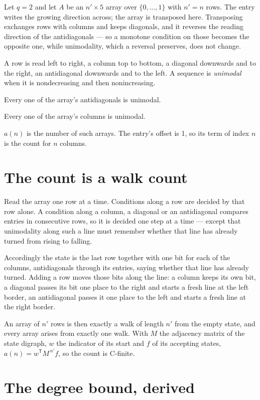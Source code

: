 \documentclass[11pt]{article}
\theoremstyle{definition}
\begin{document}
Let $q = 2$ and let $A$ be an $n' \times 5$ array over $\{0,\dots,1\}$ with $n' = n$ rows. The entry writes the growing direction across; the array is transposed here. Transposing exchanges rows with columns and keeps diagonals, and it reverses the reading direction of the antidiagonals --- so a monotone condition on those becomes the opposite one, while unimodality, which a reversal preserves, does not change.

A row is read left to right, a column top to bottom, a diagonal downwards and to the right, an antidiagonal downwards and to the left. A sequence is {\itshape unimodal} when it is nondecreasing and then nonincreasing.

Every one of the array's antidiagonals is unimodal.

Every one of the array's columns is unimodal.

$a(n)$ is the number of such arrays. The entry's offset is 1, so its term of index $n$ is the count for $n$ columns.

\section{The count is a walk count}

Read the array one row at a time. Conditions along a row are decided by that row alone. A condition along a column, a diagonal or an antidiagonal compares entries in consecutive rows, so it is decided one step at a time --- except that unimodality along such a line must remember whether that line has already turned from rising to falling.

Accordingly the state is the last row together with one bit for each of the columns, antidiagonals through its entries, saying whether that line has already turned. Adding a row moves those bits along the line: a column keeps its own bit, a diagonal passes its bit one place to the right and starts a fresh line at the left border, an antidiagonal passes it one place to the left and starts a fresh line at the right border.

An array of $n'$ rows is then exactly a walk of length $n'$ from the empty state, and every array arises from exactly one walk. With $M$ the adjacency matrix of the state digraph, $w$ the indicator of its start and $f$ of its accepting states, $a(n) = w^{\mathsf T}M^{\,n'}f$, so the count is C-finite.

\section{The degree bound, derived}
\end{document}
